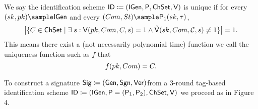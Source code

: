 \begin{definition}[$\uniqueness$]
We say the identification scheme $\mathsf{ID} \coloneqq(\mathsf{IGen}, \mathsf{P} ,\mathsf{ChSet}, \mathsf{V})$ is
unique if for every $(\sk,\pk)\sample\IDGen$ and every $(\com,\st)\sample\IDP_1(\sk,\tau)$,
$$\big{|}\{\c \in \ChSet \mid \exists \s : \IDV(\pk,\com,\c,\s) = 1 \land \IDAltV(\sk, \com, \C,  \s) \neq 1 \}\big{|} = 1.$$
This means there exist a (not necessarily polynomial time) function we call the uniqueness function such as $f$ that
$$f(pk,Com) = C.$$
\end{definition}

\begin{definition} To construct a signature $\mathsf{Sig} \coloneqq (\mathsf{Gen}, \mathsf{Sgn},
\mathsf{Ver} )$from a 3-round tag-based identification scheme  $\mathsf{ID} \coloneqq(\mathsf{IGen}, \mathsf{P}=(\mathsf{P}_1,\mathsf{P}_2) ,\mathsf{ChSet}, \mathsf{V})$ we proceed as in Figure 4.

\begin{center}
\begin{figure}[htb!]
    \nicoresetlinenr
\end{figure}
\end{center}
\end{definition}
